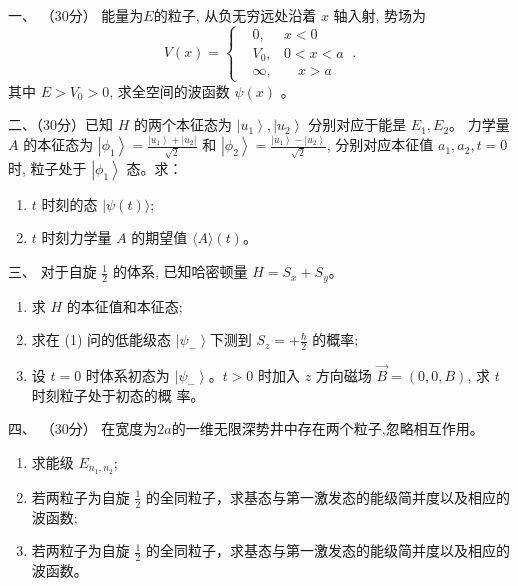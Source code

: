 
一、
	（30分） 能量为$  E $的粒子, 从负无穷远处沿着 $x$ 轴入射, 势场为
	\[ 
	V(x)=\left\{\begin{aligned}&0, &  x<0 \\ &V_{0}, & 0<x<a \\ &\infty, &  \quad x>a\end{aligned}\right. ~.
	 \] 
	其中 $E>V_{0}>0$, 求全空间的波函数 $\psi(x)$ 。



二、（30分）已知 $H$ 的两个本征态为 $\left|u_{1}\right\rangle,\left|u_{2}\right\rangle$ 分别对应于能昰 $E_{1}, E_{2}$。 力学量 $A$ 的本征态为	
$\left|\phi_{1}\right\rangle=\frac{\left|u_{1}\right\rangle+\left|u_{2}\right|}{\sqrt{2}}$ 和 $\left|\phi_{2}\right\rangle=\frac{\left|u_{1}\right\rangle-\left|u_{2}\right\rangle}{\sqrt{2}}$, 分别对应本征值 $a_{1}, a_{2}, t=0$ 时, 粒子处于 $\left|\phi_{1}\right\rangle$ 态。求：
\begin{enumerate}
	\item
	$t$ 时刻的态 $|\psi(t)\rangle$;
	\item
	 $t$ 时刻力学量 $A$ 的期望值 $\langle A\rangle(t)$。
	
	
	
\end{enumerate}

三、
对于自旋 $\frac{1}{2}$ 的体系, 已知哈密顿量 $H=S_{x}+S_{y}$。
\begin{enumerate}
	\item
	求 $H$ 的本征值和本征态;
	\item
	求在 (1) 问的低能级态 $\left|\psi_{-}\right\rangle$下测到 $S_{z}=+\frac{\hbar}{2}$ 的概率;
	\item 
	设 $t=0$ 时体系初态为 $\left|\psi_{-}\right\rangle $。$ t>0$ 时加入 $z$ 方向磁场 $\vec{B}=(0,0, B)$, 求 $t$ 时刻粒子处于初态的概 率。
	
\end{enumerate}



四、
（30分）
在宽度为$ 2a $的一维无限深势井中存在两个粒子,忽略相互作用。
\begin{enumerate}
	\item
	求能级 $E_{n_{1}, n_{2}}$;
	\item
	若两粒子为自旋 $\frac{1}{2}$ 的全同粒子，求基态与第一激发态的能级简并度以及相应的波函数;
	\item
	若两粒子为自旋 $\frac{1}{2}$ 的全同粒子，求基态与第一激发态的能级简并度以及相应的波函数。
	
	
	
\end{enumerate}

